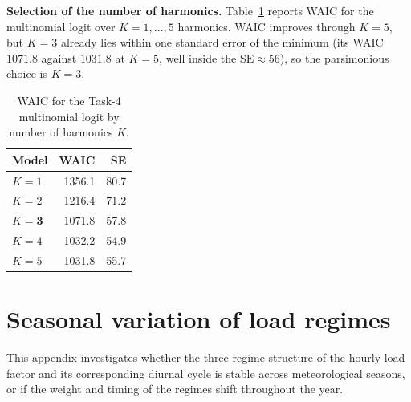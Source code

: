 \documentclass{article}
\newcommand{\bestK}{3}
\begin{document}
\textbf{Selection of the number of harmonics.} Table~\ref{tab:waicK} reports
WAIC for the multinomial logit over $K=1,\dots,5$ harmonics. WAIC improves
through $K=5$, but $K=\bestK$ already lies within one standard error of the
minimum (its WAIC $1071.8$ against $1031.8$ at $K=5$, well inside the
$\mathrm{SE}\approx 56$), so the parsimonious choice is $K=\bestK$.

\begin{table}[H]
\centering
\caption{WAIC for the Task-4 multinomial logit by number of harmonics $K$.}
\label{tab:waicK}
\begin{tabular}{lrr}
\toprule
Model  & WAIC & SE \\
\midrule
$K=1$  & 1356.1 & 80.7 \\
$K=2$  & 1216.4 & 71.2 \\
$K=\mathbf{3}$  & $\mathbf{1071.8}$ & 57.8 \\
$K=4$  & 1032.2 & 54.9 \\
$K=5$  & 1031.8 & 55.7 \\
\bottomrule
\end{tabular}
\end{table}

\newpage
\section{Seasonal variation of load regimes}
\label{app:seas}

This appendix investigates whether the three-regime structure of the hourly load factor and its corresponding diurnal cycle is stable across meteorological seasons, or if the weight and timing of the regimes shift throughout the year.
\end{document}
